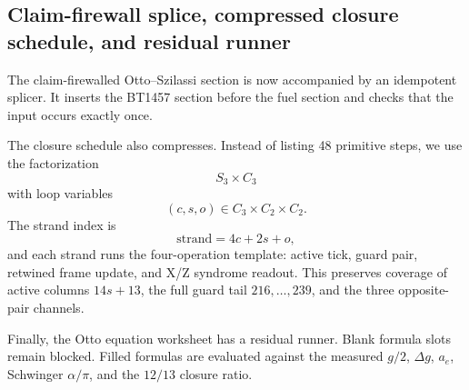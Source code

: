 \subsection{Claim-firewall splice, compressed closure schedule, and residual runner}
\label{sec:bt1459-bt1461-splicer-compressor-residual}

The claim-firewalled Otto--Szilassi section is now accompanied by an idempotent
splicer.  It inserts the BT1457 section before the fuel section and checks that
the input occurs exactly once.

The closure schedule also compresses.  Instead of listing 48 primitive steps, we
use the factorization
\[
S_3\times C_3
\]
with loop variables
\[
(c,s,o)\in C_3\times C_2\times C_2.
\]
The strand index is
\[
\mathrm{strand}=4c+2s+o,
\]
and each strand runs the four-operation template: active tick, guard pair,
retwined frame update, and X/Z syndrome readout.  This preserves coverage of
active columns \(14s+13\), the full guard tail \(216,\ldots,239\), and the three
opposite-pair channels.

Finally, the Otto equation worksheet has a residual runner.  Blank formula slots
remain blocked.  Filled formulas are evaluated against the measured \(g/2\),
\(\Delta g\), \(a_e\), Schwinger \(\alpha/\pi\), and the \(12/13\) closure ratio.
